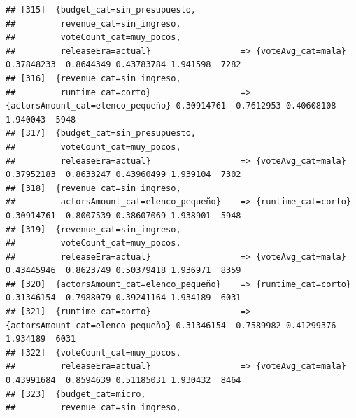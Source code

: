 \documentclass[
]{article}
\begin{document}
\begin{verbatim}
## [315]  {budget_cat=sin_presupuesto,                                                                                             
##         revenue_cat=sin_ingreso,                                                                                                
##         voteCount_cat=muy_pocos,                                                                                                
##         releaseEra=actual}                  => {voteAvg_cat=mala}                0.37848233  0.8644349 0.43783784 1.941598  7282
## [316]  {revenue_cat=sin_ingreso,                                                                                                
##         runtime_cat=corto}                  => {actorsAmount_cat=elenco_pequeño} 0.30914761  0.7612953 0.40608108 1.940043  5948
## [317]  {budget_cat=sin_presupuesto,                                                                                             
##         voteCount_cat=muy_pocos,                                                                                                
##         releaseEra=actual}                  => {voteAvg_cat=mala}                0.37952183  0.8633247 0.43960499 1.939104  7302
## [318]  {revenue_cat=sin_ingreso,                                                                                                
##         actorsAmount_cat=elenco_pequeño}    => {runtime_cat=corto}               0.30914761  0.8007539 0.38607069 1.938901  5948
## [319]  {revenue_cat=sin_ingreso,                                                                                                
##         voteCount_cat=muy_pocos,                                                                                                
##         releaseEra=actual}                  => {voteAvg_cat=mala}                0.43445946  0.8623749 0.50379418 1.936971  8359
## [320]  {actorsAmount_cat=elenco_pequeño}    => {runtime_cat=corto}               0.31346154  0.7988079 0.39241164 1.934189  6031
## [321]  {runtime_cat=corto}                  => {actorsAmount_cat=elenco_pequeño} 0.31346154  0.7589982 0.41299376 1.934189  6031
## [322]  {voteCount_cat=muy_pocos,                                                                                                
##         releaseEra=actual}                  => {voteAvg_cat=mala}                0.43991684  0.8594639 0.51185031 1.930432  8464
## [323]  {budget_cat=micro,                                                                                                       
##         revenue_cat=sin_ingreso,                                                                                                

\end{verbatim}
\end{document}
